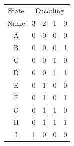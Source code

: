 \documentclass{article}
\begin{document}
\begin{table}[htbp]
  \centering
    \begin{tabular}{|c|c|c|c|c|}
    \hline
    State & \multicolumn{4}{c|}{Encoding} \bigstrut\\
\cline{2-5}    Name  & 3     & 2     & 1     & 0 \bigstrut\\
    \hline
    A     & 0     & 0     & 0     & 0 \bigstrut\\
    \hline
    B     & 0     & 0     & 0     & 1 \bigstrut\\
    \hline
    C     & 0     & 0     & 1     & 0 \bigstrut\\
    \hline
    D     & 0     & 0     & 1     & 1 \bigstrut\\
    \hline
    E     & 0     & 1     & 0     & 0 \bigstrut\\
    \hline
    F     & 0     & 1     & 0     & 1 \bigstrut\\
    \hline
    G     & 0     & 1     & 1     & 0 \bigstrut\\
    \hline
    H     & 0     & 1     & 1     & 1 \bigstrut\\
    \hline
    I     & 1     & 0     & 0     & 0 \bigstrut\\
    \hline
    \end{tabular}%
  \label{tab:out_seq}%
\end{table}%
\end{document}
